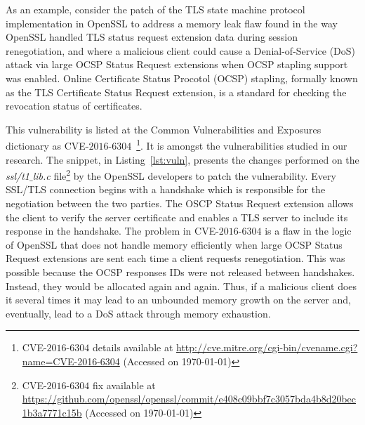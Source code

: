 \documentclass[smallextended]{svjour3}       %
\makeatletter
\newcommand\footnoteref[1]{\protected@xdef\@thefnmark{\ref{#1}}\@footnotemark}
\makeatother
\begin{document}
As an example, consider the patch of the TLS state machine protocol implementation
in OpenSSL\footnoteref{openssl} to address a memory leak flaw found in the way 
OpenSSL handled TLS status request extension data during session 
renegotiation, and where a malicious client could cause a Denial-of-Service
(DoS) attack via large OCSP Status Request extensions when OCSP stapling support
was enabled. Online Certificate Status Procotol (OCSP) stapling, formally known as the TLS Certificate 
Status Request extension, is a standard for checking the revocation status of
certificates. 

This vulnerability is listed at the Common
Vulnerabilities and Exposures dictionary as CVE-$2016$-$6304$~\footnote{CVE-$2016$-$6304$
details available at \url{http://cve.mitre.org/cgi-bin/cvename.cgi?name=CVE-2016-6304}
(Accessed on \today{})}. It is amongst the vulnerabilities studied in our
research. The snippet, in Listing~\ref{lst:vuln}, presents the changes performed on the
\emph{ssl/t1$\_$lib.c} file\footnote{CVE-$2016$-$6304$ fix available  at
\url{https://github.com/openssl/openssl/commit/e408c09bbf7c3057bda4b8d20bec1b3a7771c15b}
(Accessed on \today{})} by the OpenSSL developers to patch the vulnerability. 
Every SSL/TLS connection begins with a handshake 
which is responsible for the negotiation between the two parties. 
The OSCP Status Request extension allows the client to verify
the server certificate and enables a TLS server to include
its response in the handshake. The problem in CVE-$2016$-$6304$
is a flaw in the logic of OpenSSL that does not handle memory efficiently
when large OCSP Status Request extensions are sent each time a client 
requests renegotiation. This was possible because the OCSP responses IDs 
were not released between handshakes. Instead, they would be allocated 
again and again. Thus, if a malicious client does it several times it may lead to 
an unbounded memory growth on the server and, eventually, lead to a 
DoS attack through memory exhaustion. 
\end{document}
